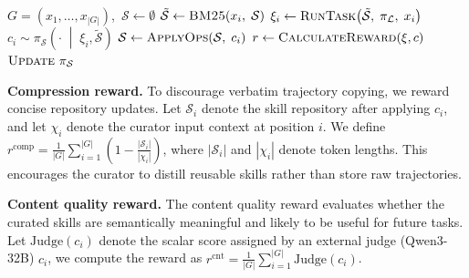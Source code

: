 \begin{algorithm}[t]
\caption{Training Skill Curator with Task Groups using GRPO}
\label{alg:mem_grpo}
\begin{algorithmic}[1]
    \State $G=(x_1,\dots,x_{|G|})$,\ $\mathcal{S}\leftarrow \emptyset$
        \State $\tilde{\mathcal{S}} \leftarrow \textsc{BM25}\!\left(x_i,\; \mathcal{S}\right)$
        \State $\xi_{i} \leftarrow \textsc{RunTask}\!\left(\tilde{\mathcal{S}},\;\pi_{\mathcal{L}},\;x_i\right)$
        \State $c_{i} \sim \pi_{\mathcal{S}}\!\left(\cdot \;\middle|\; \xi_i, \tilde{\mathcal{S}}\right)$
        \State $\mathcal{S} \leftarrow \textsc{ApplyOps}\!\left(\mathcal{S},\; c_{i}\right)$
    \EndFor
    \State $r \leftarrow \textsc{CalculateReward}(\xi, c)$
    \State $\textsc{Update}\ \pi_{\mathcal{S}}$
\EndFor
\end{algorithmic}
\end{algorithm}


\noindent\textbf{Compression reward.}\;
To discourage verbatim trajectory copying, we reward concise repository updates. 
Let $\mathcal{S}_i$ denote the skill repository after applying $c_i$, and let $\chi_i$ denote the curator input context at position $i$.
We define $r^{\text{comp}}
    =
    \frac{1}{|G|}
    \sum_{i=1}^{|G|}
    \left(
    1 - \frac{|\mathcal{S}_i|}{|\chi_i|}
    \right)$,
where $|\mathcal{S}_i|$ and $|\chi_i|$ denote token lengths.
This encourages the curator to distill reusable skills rather than store raw trajectories.


\noindent\textbf{Content quality reward.}\;
The content quality reward evaluates whether the curated skills are semantically meaningful and likely to be useful for future tasks. 
Let $\mathrm{Judge}(c_i)$ denote the scalar score assigned by an external judge (Qwen3-32B) $c_i$, we compute the reward as $
    r^{\text{cnt}}
    =
    \frac{1}{|G|}
    \sum_{i=1}^{|G|}
    \mathrm{Judge}(c_i)$.

